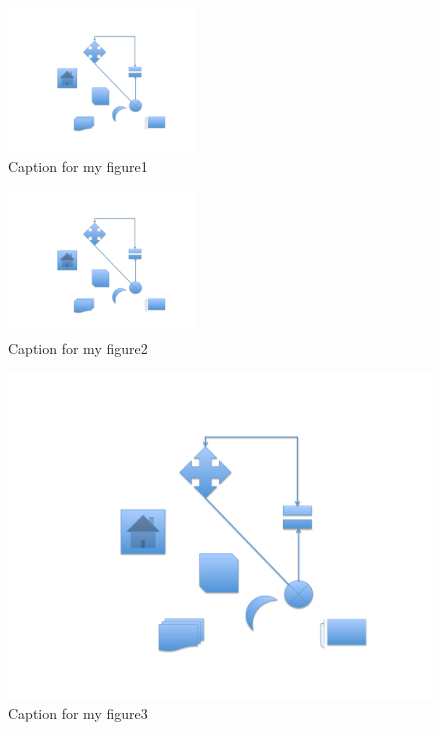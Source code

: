 \begin{figure}[h]
\centering 
\includegraphics[height=1.5in]{./pics/short}
\caption{Caption for my figure1}
\label{fig:MyFigure1}
\end{figure}

\begin{figure}[h]
\centering 
\includegraphics[height=1.5in]{./pics/small}
\caption{Caption for my figure2}
\label{fig:MyFigure2}
\end{figure}

\clearpage

\begin{figure}[h]
\centering 
\includegraphics[width=6in]{./pics/my_figure}
\caption{Caption for my figure3}
\label{fig:MyFigure3}
\end{figure}



